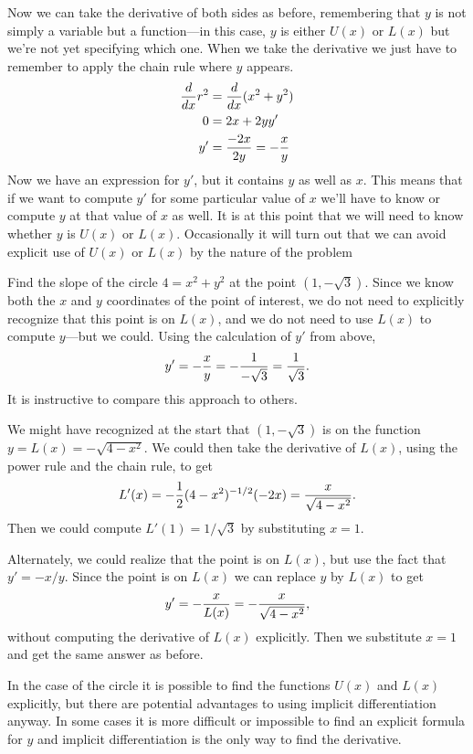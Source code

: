 Now we can take the derivative of both sides as before, remembering
that $y$ is not simply a variable but a function---in this case, $y$
is either $U(x)$ or $L(x)$ but we're not yet specifying which one.
When we take the derivative we just have to remember to apply the
chain rule where $y$ appears.
\begin{align*}
{d\over dx}r^2&={d\over dx}(x^2+y^2) \\
0&=2x+2yy' \\
y'&={-2x\over 2y}=-{x\over y} \\
\end{align*}
Now we have an expression for $y'$, but it contains $y$ as well as
$x$. This means that if we want to compute $y'$ for some particular
value of $x$ we'll have to know or compute $y$ at that value of $x$ as
well. It is at this point that we will need to know whether $y$ is
$U(x)$ or $L(x)$. Occasionally it will turn out that we can avoid
explicit use of $U(x)$ or $L(x)$ by the nature of the problem

\begin{example}
Find the slope of the circle $4=x^2+y^2$ at the point
$(1,-\sqrt{3})$. Since we know both the $x$ and $y$ coordinates of the
point of interest, we do not need to explicitly recognize that this
point is on $L(x)$, and we do not need to use $L(x)$ to compute
$y$---but we could. Using the calculation of $y'$ from above, 
$$y'=-{x\over y}=-{1\over -\sqrt{3}}={1\over \sqrt{3}}.$$
It is instructive to compare this approach to others.

We might have recognized at the start that $(1,-\sqrt{3})$ is on the
function $y=L(x)=-\sqrt{4-x^2}$. We could then take the derivative of
$L(x)$, using the power rule and the chain rule, to get
$$L'(x)=-{1\over 2}(4-x^2)^{-1/2}(-2x)={x\over\sqrt{4-x^2}}.$$
Then we could compute $L'(1)=1/\sqrt{3}$ by substituting $x=1$.

Alternately, we could realize that the point is on $L(x)$, but use the
fact that $y'=-x/y$. Since the point is on $L(x)$ we can replace $y$
by $L(x)$ to get
$$y'=-{x\over L(x)}=-{x\over \sqrt{4-x^2}},$$
without computing the derivative of $L(x)$ explicitly. Then we
substitute $x=1$ and get the same answer as before.
\end{example}

In the case of the circle it is possible to find the functions $U(x)$
and $L(x)$ explicitly, but there are potential advantages to using
implicit differentiation anyway. In some cases it is more difficult or
impossible to find an explicit formula for $y$ and implicit
differentiation is the only way to find the derivative.

